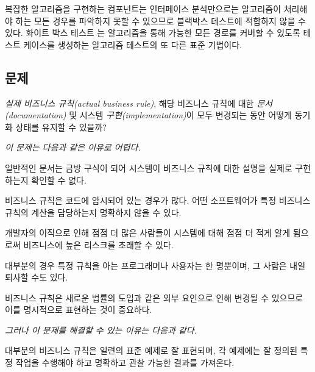 \documentclass[a4paper,10pt,twoside]{book}
\begin{document}
복잡한 알고리즘을 구현하는 컴포넌트는 인터페이스 분석만으로는 알고리즘이 처리해야 하는 모든 경우를 파악하지 못할 수 있으므로 블랙박스 테스트에 적합하지 않을 수 있다. 화이트 박스 테스트 \cite{Somm96a}는 알고리즘을 통해 가능한 모든 경로를 커버할 수 있도록 테스트 케이스를 생성하는 알고리즘 테스트의 또 다른 표준 기법이다.



\subsection*{문제}

\emph{실제 비즈니스 규칙(actual business rule)}, 해당 비즈니스 규칙에 대한 \emph{문서(documentation)} 및 시스템 \emph{구현(implementation)}이 모두 변경되는 동안 어떻게 동기화 상태를 유지할 수 있을까?

\emph{이 문제는 다음과 같은 이유로 어렵다.}

\begin{bulletlist}
\item 일반적인 문서는 금방 구식이 되어 시스템이 비즈니스 규칙에 대한 설명을 실제로 구현하는지 확인할 수 없다.
\item 비즈니스 규칙은 코드에 암시되어 있는 경우가 많다. 어떤 소프트웨어가 특정 비즈니스 규칙의 계산을 담당하는지 명확하지 않을 수 있다.
\item 개발자의 이직으로 인해 점점 더 많은 사람들이 시스템에 대해 점점 더 적게 알게 됨으로써 비즈니스에 높은 리스크를 초래할 수 있다.
\item 대부분의 경우 특정 규칙을 아는 프로그래머나 사용자는 한 명뿐이며, 그 사람은 내일 퇴사할 수도 있다.
\item 비즈니스 규칙은 새로운 법률의 도입과 같은 외부 요인으로 인해 변경될 수 있으므로 이를 명시적으로 표현하는 것이 중요하다.
\end{bulletlist}

\emph{그러나 이 문제를 해결할 수 있는 이유는 다음과 같다.}

\begin{bulletlist}
\item 대부분의 비즈니스 규칙은 일련의 표준 예제로 잘 표현되며, 각 예제에는 잘 정의된 특정 작업을 수행해야 하고 명확하고 관찰 가능한 결과를 가져온다.
\end{bulletlist}
\end{document}
